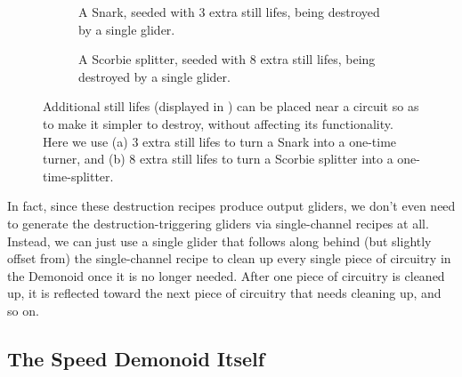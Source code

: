 \begin{figure}[!htb]
	\centering
	\begin{subfigure}{0.455\textwidth}
		\centering
		\caption{A Snark, seeded with 3 extra still lifes, being destroyed by a single glider.}
		\label{fig:snark_seeded_destroy}
	\end{subfigure} \hfill %
	\begin{subfigure}{0.505\textwidth}
		\centering
		\caption{A Scorbie splitter, seeded with 8 extra still lifes, being destroyed by a single glider.}
		\label{fig:scorbie_splitter_seeded_destroy}
	\end{subfigure}
	\caption{Additional still lifes (displayed in ) can be placed near a circuit so as to make it simpler to destroy, without affecting its functionality. Here we use (a) 3 extra still lifes to turn a Snark into a one-time turner, and (b) 8 extra still lifes to turn a Scorbie splitter into a one-time-splitter.}\label{fig:snark_scorbie_seeded_destroy}
\end{figure}

In fact, since these destruction recipes produce output gliders, we don't even need to generate the destruction-triggering gliders via single-channel recipes at all. Instead, we can just use a single glider that follows along behind (but slightly offset from) the single-channel recipe to clean up every single piece of circuitry in the Demonoid once it is no longer needed. After one piece of circuitry is cleaned up, it is reflected toward the next piece of circuitry that needs cleaning up, and so on.




\subsection{The Speed Demonoid Itself}\label{sec:speed_demonoid}

